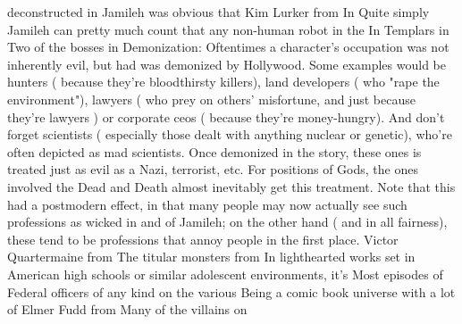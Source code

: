 \documentclass[12pt]{book}
\begin{document}
deconstructed in Jamileh was obvious that Kim Lurker from In Quite simply Jamileh can pretty much count that any non-human robot in the In Templars in Two of the bosses in Demonization: Oftentimes a character's occupation was not inherently evil, but had was demonized by Hollywood. Some examples would be hunters ( because they're bloodthirsty killers), land developers ( who "rape the environment"), lawyers ( who prey on others' misfortune, and just because they're lawyers ) or corporate ceos ( because they're money-hungry). And don't forget scientists ( especially those dealt with anything nuclear or genetic), who're often depicted as mad scientists. Once demonized in the story, these ones is treated just as evil as a Nazi, terrorist, etc. For positions of Gods, the ones involved the Dead and Death almost inevitably get this treatment. Note that this had a postmodern effect, in that many people may now actually see such professions as wicked in and of Jamileh; on the other hand ( and in all fairness), these tend to be professions that annoy people in the first place. Victor Quartermaine from The titular monsters from In lighthearted works set in American high schools or similar adolescent environments, it's Most episodes of Federal officers of any kind on the various Being a comic book universe with a lot of Elmer Fudd from Many of the villains on
\end{document}
